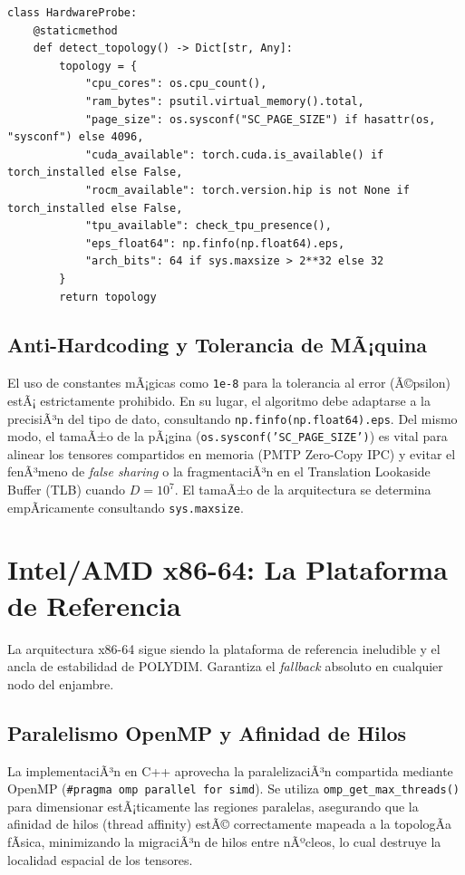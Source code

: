 \begin{verbatim}
class HardwareProbe:
    @staticmethod
    def detect_topology() -> Dict[str, Any]:
        topology = {
            "cpu_cores": os.cpu_count(),
            "ram_bytes": psutil.virtual_memory().total,
            "page_size": os.sysconf("SC_PAGE_SIZE") if hasattr(os, "sysconf") else 4096,
            "cuda_available": torch.cuda.is_available() if torch_installed else False,
            "rocm_available": torch.version.hip is not None if torch_installed else False,
            "tpu_available": check_tpu_presence(),
            "eps_float64": np.finfo(np.float64).eps,
            "arch_bits": 64 if sys.maxsize > 2**32 else 32
        }
        return topology
\end{verbatim}

\subsection{Anti-Hardcoding y Tolerancia de MÃ¡quina}
El uso de constantes mÃ¡gicas como \texttt{1e-8} para la tolerancia al error (Ã©psilon) estÃ¡ estrictamente prohibido. En su lugar, el algoritmo debe adaptarse a la precisiÃ³n del tipo de dato, consultando \texttt{np.finfo(np.float64).eps}. Del mismo modo, el tamaÃ±o de la pÃ¡gina (\texttt{os.sysconf('SC\_PAGE\_SIZE')}) es vital para alinear los tensores compartidos en memoria (PMTP Zero-Copy IPC) y evitar el fenÃ³meno de \textit{false sharing} o la fragmentaciÃ³n en el Translation Lookaside Buffer (TLB) cuando \(D = 10^7\). El tamaÃ±o de la arquitectura se determina empÃ­ricamente consultando \texttt{sys.maxsize}.

\section{Intel/AMD x86-64: La Plataforma de Referencia}
\label{sec:x86_64_reference}

La arquitectura x86-64 sigue siendo la plataforma de referencia ineludible y el ancla de estabilidad de POLYDIM. Garantiza el \textit{fallback} absoluto en cualquier nodo del enjambre.

\subsection{Paralelismo OpenMP y Afinidad de Hilos}
La implementaciÃ³n en C++ aprovecha la paralelizaciÃ³n compartida mediante OpenMP (\texttt{\#pragma omp parallel for simd}). Se utiliza \texttt{omp\_get\_max\_threads()} para dimensionar estÃ¡ticamente las regiones paralelas, asegurando que la afinidad de hilos (thread affinity) estÃ© correctamente mapeada a la topologÃ­a fÃ­sica, minimizando la migraciÃ³n de hilos entre nÃºcleos, lo cual destruye la localidad espacial de los tensores.

